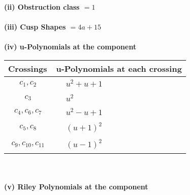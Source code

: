 \documentclass[1p]{elsarticle_modified}
\theoremstyle{definition}
\begin{document}
\flushleft \textbf{(ii) Obstruction class $= 1$}\\~\\
\flushleft \textbf{(iii) Cusp Shapes $= 4 a+15$}\\~\\
\newpage\renewcommand{\arraystretch}{1}
\flushleft \textbf{(iv) u-Polynomials at the component}\newline \\
\begin{tabular}{m{50pt}|m{274pt}}
Crossings & \hspace{64pt}u-Polynomials at each crossing \\
\hline $$\begin{aligned}c_{1},c_{2}\end{aligned}$$&$\begin{aligned}
&u^2+u+1
\end{aligned}$\\
\hline $$\begin{aligned}c_{3}\end{aligned}$$&$\begin{aligned}
&u^2
\end{aligned}$\\
\hline $$\begin{aligned}c_{4},c_{6},c_{7}\end{aligned}$$&$\begin{aligned}
&u^2- u+1
\end{aligned}$\\
\hline $$\begin{aligned}c_{5},c_{8}\end{aligned}$$&$\begin{aligned}
&(u+1)^2
\end{aligned}$\\
\hline $$\begin{aligned}c_{9},c_{10},c_{11}\end{aligned}$$&$\begin{aligned}
&(u-1)^2
\end{aligned}$\\
\hline
\end{tabular}\\~\\
\newpage\renewcommand{\arraystretch}{1}
\flushleft \textbf{(v) Riley Polynomials at the component}\newline \\
\end{document}

